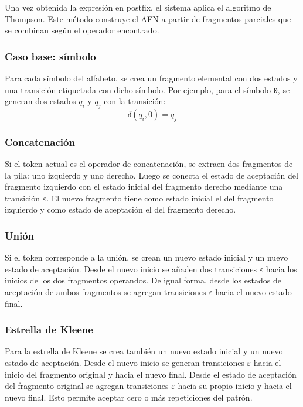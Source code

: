 \documentclass[12pt]{article}
\begin{document}
Una vez obtenida la expresión en postfix, el sistema aplica el algoritmo de Thompson. Este método construye el AFN a partir de fragmentos parciales que se combinan según el operador encontrado.

\subsubsection{Caso base: símbolo}

Para cada símbolo del alfabeto, se crea un fragmento elemental con dos estados y una transición etiquetada con dicho símbolo. Por ejemplo, para el símbolo \texttt{0}, se generan dos estados $q_i$ y $q_j$ con la transición:
\[
\delta(q_i, 0) = q_j
\]

\subsubsection{Concatenación}

Si el token actual es el operador de concatenación, se extraen dos fragmentos de la pila: uno izquierdo y uno derecho. Luego se conecta el estado de aceptación del fragmento izquierdo con el estado inicial del fragmento derecho mediante una transición $\varepsilon$. El nuevo fragmento tiene como estado inicial el del fragmento izquierdo y como estado de aceptación el del fragmento derecho.

\subsubsection{Unión}

Si el token corresponde a la unión, se crean un nuevo estado inicial y un nuevo estado de aceptación. Desde el nuevo inicio se añaden dos transiciones $\varepsilon$ hacia los inicios de los dos fragmentos operandos. De igual forma, desde los estados de aceptación de ambos fragmentos se agregan transiciones $\varepsilon$ hacia el nuevo estado final.

\subsubsection{Estrella de Kleene}

Para la estrella de Kleene se crea también un nuevo estado inicial y un nuevo estado de aceptación. Desde el nuevo inicio se generan transiciones $\varepsilon$ hacia el inicio del fragmento original y hacia el nuevo final. Desde el estado de aceptación del fragmento original se agregan transiciones $\varepsilon$ hacia su propio inicio y hacia el nuevo final. Esto permite aceptar cero o más repeticiones del patrón.
\end{document}

